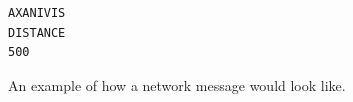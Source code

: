\documentclass[12pt,a4paper,notitlepage]{report}
\begin{document}

\begin{figure}[h]
  \lstset{%
    basicstyle=\ttfamily\bfseries,
    xleftmargin=.4\textwidth, xrightmargin=.2\textwidth
  }
\begin{lstlisting}
AXANIVIS
DISTANCE
500
\end{lstlisting}
\caption{An example of how a network message would look like.
\label{fig:example_message}}
\end{figure}
\end{document}
